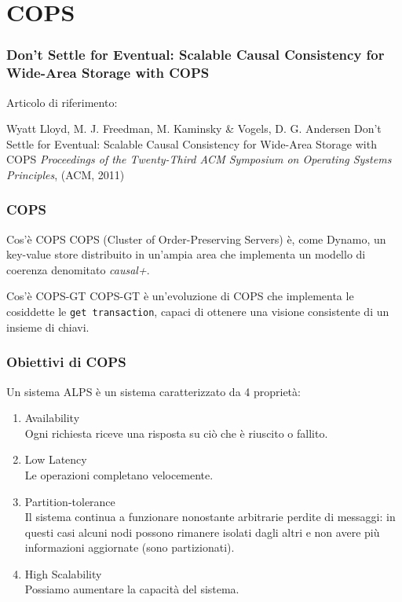 \section{COPS}
\begin{frame}
  \frametitle{Don't Settle for Eventual: Scalable Causal Consistency for Wide-Area Storage with COPS}
  Articolo di riferimento: \\
  \begin{thebibliography}{9}
   Wyatt Lloyd, M. J. Freedman, M. Kaminsky \& Vogels, D. G. Andersen
  \newblock Don't Settle for Eventual: Scalable Causal Consistency for Wide-Area Storage with COPS
  \newblock \emph{Proceedings of the Twenty-Third ACM Symposium on Operating Systems Principles}, (ACM, 2011)
  \end{thebibliography}
\end{frame}

\begin{frame}
\frametitle{COPS}
\begin{block}{Cos'è COPS}
COPS (Cluster of Order-Preserving Servers) è, come Dynamo,
un key-value store distribuito in un'ampia area che implementa un modello di coerenza
denomitato \textit{causal+}.
\end{block}
\begin{block}{Cos'è COPS-GT}
COPS-GT è un'evoluzione di COPS che implementa le cosiddette le \texttt{get transaction},
capaci di ottenere una visione consistente di un insieme di chiavi.
\end{block}
\end{frame}

\begin{frame}
\frametitle{Obiettivi di COPS}
	\begin{definizione}
	Un \alert{sistema ALPS} è un sistema caratterizzato da 4 proprietà:
	\begin{enumerate}
		\item<1-> Availability \\
				  Ogni richiesta riceve una risposta su ciò che è riuscito o fallito.
		\item<1-> Low Latency \\
				  Le operazioni completano velocemente.
		\item<1-> Partition-tolerance \\
				  Il sistema continua a funzionare nonostante arbitrarie perdite di messaggi:
				  in questi casi alcuni nodi possono rimanere isolati dagli altri e non avere
				  più informazioni aggiornate (sono partizionati).
		\item<1-> High Scalability \\
				  Possiamo aumentare la capacità del sistema.
	\end{enumerate}
	\end{definizione}
\end{frame}

